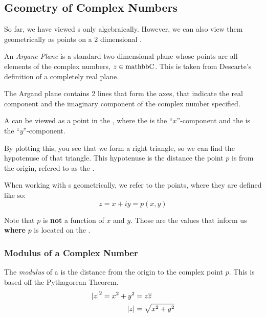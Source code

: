 \subsection{Geometry of Complex Numbers}\label{subsec:Geometry_Complex_Numbers}
So far, we have viewed s only algebraically.
However, we can also view them geometrically as points on a 2 dimensional .

\begin{definition}\label{def:Argand_Plane}
  An \emph{Argane Plane} is a standard two dimensional plane whose points are all elements of the complex numbers, $z \in \operatorname{mathbb{C}}$.
  This is taken from Descarte's definition of a completely real plane.

  The Argand plane contains 2 lines that form the axes, that indicate the real component and the imaginary component of the complex number specified.
\end{definition}

A  can be viewed as a point in the , where the  is the ``$x$''-component and the  is the ``$y$''-component.

By plotting this, you see that we form a right triangle, so we can find the hypotenuse of that triangle.
This hypotenuse is the distance the point $p$ is from the origin, refered to as the .
\begin{remark*}
  When working with s geometrically, we refer to the points, where they are defined like so:
  \begin{equation*}
    z = x + iy = p(x, y)
  \end{equation*}

  Note that $p$ is \textbf{not} a function of $x$ and $y$.
  Those are the values that inform us \textbf{where} $p$ is located on the .
\end{remark*}

\subsubsection{Modulus of a Complex Number}\label{subsubsec:Complex_Number_Modulus}
\begin{definition}[Modulus]\label{def:Complex_Number_Modulus}
  The \emph{modulus} of a  is the distance from the origin to the complex point $p$.
  This is based off the Pythagorean Theorem.
  \begin{equation}\label{eq:Complex_Number_Modulus}
    \begin{aligned}
      {\lvert z \rvert}^{2} = x^{2} + y^{2} &= z \overline{z} \\
      \lvert z \rvert &= \sqrt{x^{2} + y^{2}}
    \end{aligned}
  \end{equation}
\end{definition}


